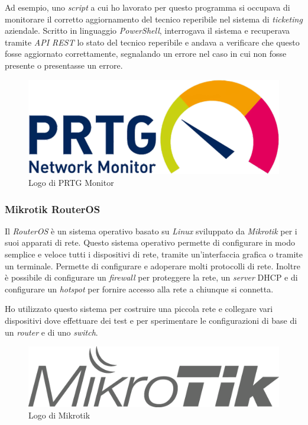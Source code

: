 Ad esempio, uno \emph{script} a cui ho lavorato per questo programma si occupava di monitorare il corretto aggiornamento del tecnico reperibile nel sistema di \emph{ticketing} aziendale. Scritto in linguaggio \emph{PowerShell}, interrogava il sistema e recuperava tramite \emph{API REST} lo stato del tecnico reperibile e andava a verificare che questo fosse aggiornato correttamente, segnalando un errore nel caso in cui non fosse presente o presentasse un errore.

\begin{figure}[!htbp]
    \centering
    \includegraphics[width=0.5\linewidth]{images/loghi/prtg-monitor.png}
    \caption{Logo di PRTG Monitor}
    \label{fig:prtg-logo}
\end{figure}

\subsubsection{Mikrotik RouterOS}

Il \emph{RouterOS} è un sistema operativo basato su \emph{Linux} sviluppato da \emph{Mikrotik} per i suoi apparati di rete. Questo sistema operativo permette di configurare in modo semplice e veloce tutti i dispositivi di rete, tramite un'interfaccia grafica o tramite un terminale. Permette di configurare e adoperare molti protocolli di rete. Inoltre è possibile di configurare un \emph{firewall} per proteggere la rete, un \emph{server} DHCP e di configurare un \emph{hotspot} per fornire accesso alla rete a chiunque si connetta.

Ho utilizzato questo sistema per costruire una piccola rete e collegare vari dispositivi dove effettuare dei test e per sperimentare le configurazioni di base di un \emph{router} e di uno \emph{switch}.

\begin{figure}[!htbp]
    \centering
    \includegraphics[width=0.6\linewidth]{images/loghi/mikrotik.png}
    \caption{Logo di Mikrotik}
    \label{fig:mikrotik-logo}
\end{figure}


